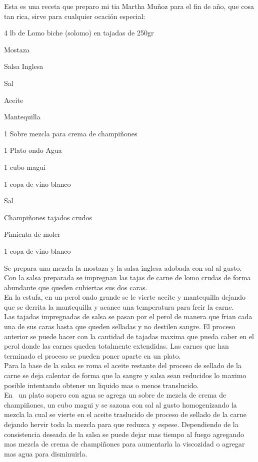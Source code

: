 Esta es una receta que preparo mi tia Martha Muñoz para el fin de año, que cosa tan rica, sirve para cualquier ocación especial:
\begin{ingredientes}
\item 4 lb de Lomo biche (solomo) en tajadas de 250gr
\item Mostaza
\item Salsa Inglesa
\item Sal
\item Aceite
\item Mantequilla
\item 1 Sobre mezcla para crema de champiñones
\item 1 Plato ondo Agua
\item 1 cubo magui
\item 1 copa de vino blanco
\item Sal
\item Champiñones tajados crudos
\item Pimienta de moler
\item 1 copa de vino blanco
\end{ingredientes}
\preparacion
Se prepara una mezcla la mostaza y la salsa inglesa adobada con sal al gusto.\\

Con la salsa preparada se impregnan las tajas de carne de lomo crudas de forma abundante que queden cubiertas sus dos caras.\\

En la estufa, en un perol ondo grande se le vierte aceite y mantequilla dejando que se derrita la mantequilla y acance una temperatura para freir la carne.\\

Las tajadas impregnadas de salsa se pasan por el perol de manera que frian cada una de sus caras hasta que queden selladas y no destilen sangre. El proceso anterior se puede hacer con la cantidad de tajadas maxima que pueda caber en el perol donde las carnes queden totalmente extendidas. Las carnes que han terminado el proceso se pueden poner aparte en un plato.\\

Para la base de la salsa se roma el aceite restante del proceso de sellado de la carne se deja calentar de forma que la sangre y salsa sean reducidos lo maximo posible intentando obtener un liquido mas o menos translucido.\\

En  un plato sopero con agua se agrega un sobre de mezcla de crema de champiñones, un cubo magui y se sazona con sal al gusto homogenizando la mezcla la cual se vierte en el aceite traslucido de proceso de sellado de la carne dejando hervir toda la mezcla para que reduzca y espese. Dependiendo de la consistencia deseada de la salsa se puede dejar mas tiempo al fuego agregando mas mezcla de crema de champiñones para aumentarla la viscozidad o agregar mas agua para disminuirla.\\

